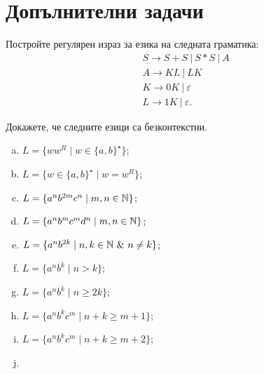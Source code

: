 \section{Допълнителни задачи}

\begin{problem}
  Постройте регулярен израз за езика на следната граматика:
  \begin{align*}
    & S \to S + S\ |\ S * S\ |\ A\\
    & A \to KL\ |\ LK\\
    & K \to 0K\ |\ \varepsilon\\
    & L \to 1K\ |\ \varepsilon.
  \end{align*}
\end{problem}


\begin{problem}
  Докажете, че следните езици са безконтекстни.
  \begin{enumerate}[a)]
  \item
    $L = \{ww^R \mid w \in \{a,b\}^\star\}$;
  \item
    $L = \{w \in \{a,b\}^\star \mid w = w^R\}$;
  \item
    $L = \{a^nb^{2m}c^{n} \mid m,n \in \mathbb{N}\}$;
  \item
    $L = \{a^nb^{m}c^{m}d^n \mid m,n \in \mathbb{N}\}$;
  \item
    $L = \{a^nb^{2k} \mid n,k \in \Nat\ \&\ n \neq k\}$;
  \item
    $L = \{a^nb^k \mid n > k\}$;
  \item
    $L = \{a^nb^k \mid n \geq 2k\}$;
  \item
    $L = \{a^nb^kc^m \mid n + k \geq m+1\}$;
  \item
    $L = \{a^nb^kc^m \mid n + k \geq m+2\}$;
  \item

\end{enumerate}
\end{problem}
